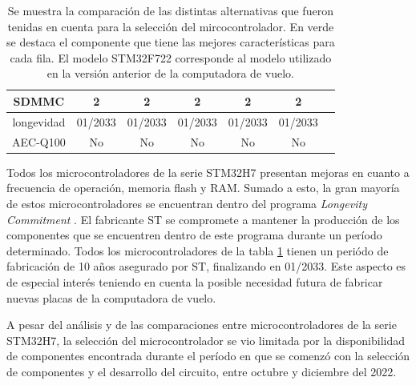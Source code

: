 \begin{table}[htb]
\begin{tabular}{|c||c|c|c|c|c|c|}
        \hline
        SDMMC & \cellcolor{green!25}2 & \cellcolor{green!25}2 & \cellcolor{green!25}2 & \cellcolor{green!25}2 & \cellcolor{green!25}2\\
        \hline
        longevidad & \cellcolor{green!25}01/2033 & \cellcolor{green!25}01/2033 & \cellcolor{green!25}01/2033 & \cellcolor{green!25}01/2033 & \cellcolor{green!25}01/2033\\
        \hline
        AEC-Q100 & No & No & No & No & No\\
        \hline       
    \end{tabular}
    \caption{Se muestra la comparación de las distintas alternativas que fueron tenidas en cuenta para la selección del mircocontrolador. En verde se destaca el componente que tiene las mejores características para cada fila. El modelo STM32F722 corresponde al modelo utilizado en la versión anterior de la computadora de vuelo.}
    \label{tab:comparacion_MCUs}
\end{table}

Todos los microcontroladores de la serie STM32H7 presentan mejoras en cuanto a frecuencia de operación, memoria flash y RAM. Sumado a esto, la gran mayoría de estos microcontroladores se encuentran dentro del programa \textit{Longevity Commitment} \cite{longevity_ST}. El fabricante ST se compromete a mantener la producción de los componentes que se encuentren dentro de este programa durante un período determinado. Todos los microcontroladores de la tabla \ref{tab:comparacion_MCUs} tienen un periódo de fabricación de 10 años asegurado por ST, finalizando en 01/2033. Este aspecto es de especial interés teniendo en cuenta la posible necesidad futura de fabricar nuevas placas de la computadora de vuelo.




A pesar del análisis y de las comparaciones entre microcontroladores de la serie STM32H7, la selección del microcontrolador se vio limitada por la disponibilidad de componentes encontrada durante el período en que se comenzó con la selección de componentes y el desarrollo del circuito, entre octubre y diciembre del 2022.

